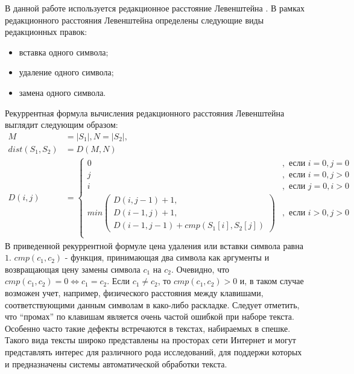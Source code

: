 В данной работе используется редакционное расстояние Левенштейна \cite{manning}. В рамках редакционного расстояния Левенштейна определены следующие виды редакционных правок:
\begin{itemize}
	\item
	вставка одного символа;
	\item
	удаление одного символа;
	\item
	замена одного символа.
\end{itemize}
Рекуррентная формула вычисления редакционного расстояния Левенштейна выглядит следующим образом:
\begin{align} 
	M &= |S_1|, N = |S_2|, \\
	dist(S_1, S_2) &= D(M, N) \\
	D(i, j) &= 
	\begin{cases}
		0&,\text{ если } i = 0, j = 0 \\
		j&,\text{ если } i = 0, j > 0 \\
		i&,\text{ если } j = 0, i > 0 \\
		min(\substack{
			D(i, j - 1) + 1, \\
			D(i - 1, j) + 1, \\
			D(i - 1, j - 1) + cmp(S_1[i], S_2[j])
		})&,\text{ если } i > 0, j > 0 \\  
	\end{cases}
\end{align}
В приведенной рекуррентной формуле цена удаления или вставки символа равна \(1\). \(cmp(c_1, c_2)\) - функция, принимающая два символа как аргументы и возвращающая цену замены символа \(c_1\) на \(c_2\). Очевидно, что \( cmp(c_1, c_2) = 0 \Leftrightarrow c_1 = c_2\). Если \(c_1 \neq c_2\), то \( cmp(c_1, c_2) > 0 \) и, в таком случае возможен учет, например, физического расстояния между клавишами, соответствующими данным символам в како-либо раскладке. Следует отметить, что ``промах'' по клавишам является очень частой ошибкой при наборе текста. Особенно часто такие дефекты встречаются в текстах, набираемых в спешке. Такого вида тексты широко представлены на просторах сети Интернет и могут представлять интерес для различного рода исследований, для поддержи которых и предназначены системы автоматической обработки текста.

